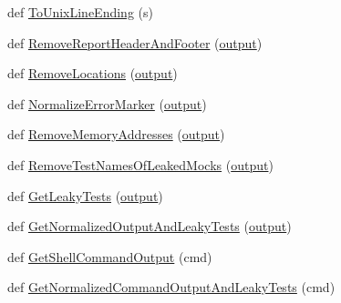 \begin{DoxyCompactItemize}
\item 
def \mbox{\hyperlink{namespacegmock__output__test_a5c9ae3611cc4fac1e1340a3345865cf3}{To\+Unix\+Line\+Ending}} (s)
\item 
def \mbox{\hyperlink{namespacegmock__output__test_a2ebfc0abfb0ed307021ecaa9da465c55}{Remove\+Report\+Header\+And\+Footer}} (\mbox{\hyperlink{namespacegmock__output__test_a4277f8598ba3835393fe82e82d09375d}{output}})
\item 
def \mbox{\hyperlink{namespacegmock__output__test_aa3c93f8085ff0886bf0d160d71af2452}{Remove\+Locations}} (\mbox{\hyperlink{namespacegmock__output__test_a4277f8598ba3835393fe82e82d09375d}{output}})
\item 
def \mbox{\hyperlink{namespacegmock__output__test_af3c1f95f19b9f048843a2d562d459b24}{Normalize\+Error\+Marker}} (\mbox{\hyperlink{namespacegmock__output__test_a4277f8598ba3835393fe82e82d09375d}{output}})
\item 
def \mbox{\hyperlink{namespacegmock__output__test_a58b4fdb82b40d01d32b09d4c14ba11a5}{Remove\+Memory\+Addresses}} (\mbox{\hyperlink{namespacegmock__output__test_a4277f8598ba3835393fe82e82d09375d}{output}})
\item 
def \mbox{\hyperlink{namespacegmock__output__test_ac0628c5630d869dae45601df9d909638}{Remove\+Test\+Names\+Of\+Leaked\+Mocks}} (\mbox{\hyperlink{namespacegmock__output__test_a4277f8598ba3835393fe82e82d09375d}{output}})
\item 
def \mbox{\hyperlink{namespacegmock__output__test_a60299c4f0cb666d08f101ddaa7aabed4}{Get\+Leaky\+Tests}} (\mbox{\hyperlink{namespacegmock__output__test_a4277f8598ba3835393fe82e82d09375d}{output}})
\item 
def \mbox{\hyperlink{namespacegmock__output__test_a590ba3b918e5599eeabc2cbf597e2ce1}{Get\+Normalized\+Output\+And\+Leaky\+Tests}} (\mbox{\hyperlink{namespacegmock__output__test_a4277f8598ba3835393fe82e82d09375d}{output}})
\item 
def \mbox{\hyperlink{namespacegmock__output__test_a001498a3e9bf552ee429e434eb00cb08}{Get\+Shell\+Command\+Output}} (cmd)
\item 
def \mbox{\hyperlink{namespacegmock__output__test_a1796bc395fbfb8873992e3f84378e4bf}{Get\+Normalized\+Command\+Output\+And\+Leaky\+Tests}} (cmd)
\end{DoxyCompactItemize}
